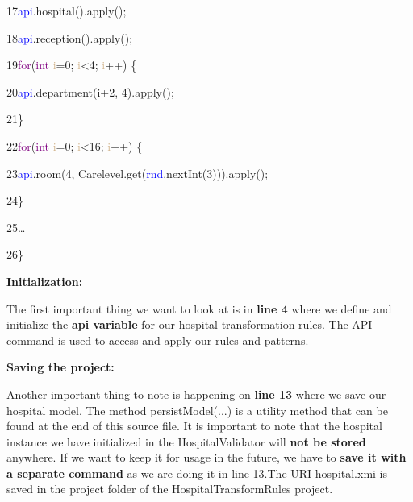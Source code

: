 {17\hspace{1.5cm}\textcolor{blue}{api}.hospital().apply();

18\hspace{1.5cm}\textcolor{blue}{api}.reception().apply();

19\hspace{1.5cm}\textcolor{Purple}{for}(\textcolor{Purple}{int} \textcolor{Tan}{i}=0; \textcolor{Tan}{i}<4; \textcolor{Tan}{i}++) \{

20\hspace{2.0cm}\textcolor{blue}{api}.department(i+2, 4).apply();

21\hspace{1.5cm}\}

22\hspace{1.5cm}\textcolor{Purple}{for}(\textcolor{Purple}{int} \textcolor{Tan}{i}=0; \textcolor{Tan}{i}<16; \textcolor{Tan}{i}++) \{

23\hspace{2.0cm}\textcolor{blue}{api}.room(4, Carelevel.get(\textcolor{blue}{rnd}.nextInt(3))).apply();

24\hspace{1.5cm}\} 

25\hspace{1.5cm}…

26\hspace{1.0cm}\}

}

\clearpage

\textbf{Initialization:}

The first important thing we want to look at is in \textbf{line 4} where we define and initialize the \textbf{api variable} for our hospital transformation rules.\newline
The API command is used to access and apply our rules and patterns.\newline

\textbf{Saving the project:}

Another important thing to note is happening on \textbf{line 13} where we save our hospital model. The method \textsf{persistModel(...)} is a utility method that can be found at the end of this source file. It is important to note that the hospital instance we have initialized in the \textsf{HospitalValidator} will \textbf{not be stored} anywhere. If we want to keep it for usage in the future, we have to \textbf{save it with a separate command} as we are doing it in line 13.\newline The URI \textsf{hospital.xmi} is saved in the project folder of the \textsf{HospitalTransformRules} project.\newline

